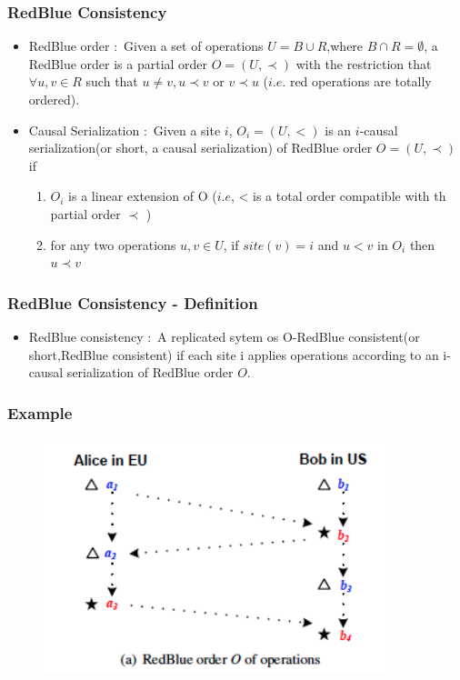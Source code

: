 \documentclass{beamer}
\begin{document}
\begin{frame}
\frametitle{RedBlue Consistency}
\begin{itemize}
\item RedBlue order $\colon$ Given a set of operations $U = B \cup R$,where $B \cap R = \emptyset$, a RedBlue order is a partial order $O = ( U, \prec)$ with the restriction that $\forall u,v \in R$ such that $u \neq v, u \prec v $ or $v \prec u$ ($i.e.$ red operations are totally ordered).

\item Causal Serialization $\colon$ Given a site $i$, $O_i = (U, <)$ is an $i$-causal serialization(or short, a causal serialization) of RedBlue order $O = ( U, \prec)$ if 
 \begin{enumerate}
\item$O_i$ is a linear extension of O ($i.e$, < is a total order compatible with th partial order $\prec$ ) 
\item for any two operations $u,v \in U$, if $site(v) = i$ and $u < v$ in $O_i$ then $u \prec v$
\end{enumerate} 
\end{itemize}

\end{frame}



\begin{frame}
\frametitle{RedBlue Consistency - Definition}
\begin{itemize}
\item RedBlue consistency $\colon$ A replicated sytem os O-RedBlue consistent(or short,RedBlue consistent) if each site i applies operations according to an i-causal serialization of RedBlue order $O$.
\end{itemize}
\end{frame}


\begin{frame}
\frametitle{Example}
\begin{figure}[t]
\includegraphics[width=10cm]{pic2.jpg}
\centering
\end{figure}
\end{frame}
\end{document}
